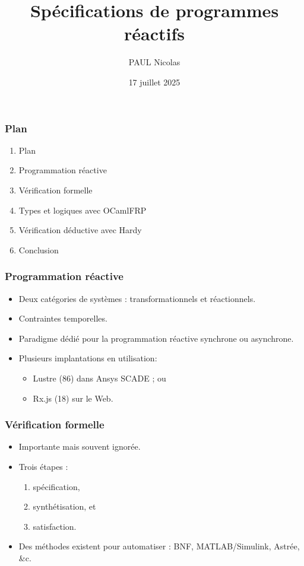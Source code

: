 \documentclass{beamer}
\title{Spécifications de programmes réactifs}
\author{PAUL Nicolas}
\institute[]{nicolas.paul1@etu.univ-orleans.fr}
\date{17 juillet 2025}
\begin{document}

\begin{frame}
\titlepage
\end{frame}


\begin{frame}
\frametitle{Plan}

\begin{enumerate}
\item Plan
\item Programmation réactive
\item Vérification formelle
\item Types et logiques avec OCamlFRP
\item Vérification déductive avec Hardy
\item Conclusion
\end{enumerate}
\end{frame}


\begin{frame}
\frametitle{Programmation réactive}

\begin{itemize}
\item Deux catégories de systèmes :
      transformationnels et réactionnels.
\item Contraintes temporelles.
\item Paradigme dédié pour la programmation
      réactive synchrone ou asynchrone.
\item Plusieurs implantations en utilisation:
      \begin{itemize}
      \item Lustre (86) dans Ansys SCADE ; ou
      \item Rx.js (18) sur le Web.
      \end{itemize}
\end{itemize}
\end{frame}



\begin{frame}
\frametitle{Vérification formelle}

\begin{itemize}
\item Importante mais souvent ignorée.
\item Trois étapes :
      \begin{enumerate}
      \item spécification,
      \item synthétisation, et
      \item satisfaction.
      \end{enumerate}
\item Des méthodes existent pour automatiser :
      BNF, MATLAB/Simulink, Astrée, \&c.
\end{itemize}
\end{frame}
\end{document}
